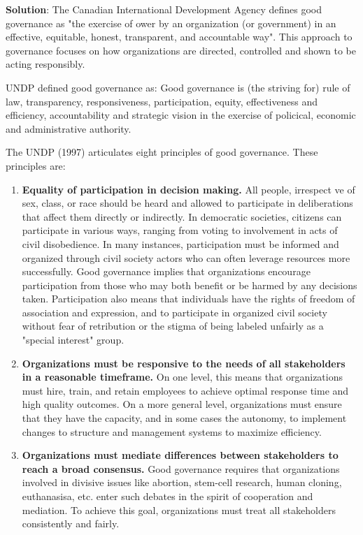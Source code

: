 \documentclass[
  openany]{book}
\newenvironment{solution}{ {\bfseries Solution}:}{}
\begin{document}
\begin{questions}
\begin{solution}
The Canadian International Development Agency defines good governance as "the exercise of ower by an organization (or government) in an effective, equitable, honest, transparent, and accountable way". This approach to governance focuses on how organizations are directed, controlled and shown to be acting responsibly.

UNDP defined good governance as: Good governance is (the striving for) rule of law, transparency, responsiveness, participation, equity, effectiveness and efficiency, accountability and strategic vision in the exercise of policical, economic and administrative authority.

The UNDP (1997) articulates eight principles of good governance. These principles are:

\begin{enumerate}
\item \textbf{Equality of participation in decision making.} All people, irrespect ve of sex, class, or race should be heard and allowed to participate in deliberations that affect them directly or indirectly. In democratic societies, citizens can participate in various ways, ranging from voting to involvement in acts of civil disobedience. In many instances, participation must be informed and organized through civil society actors who can often leverage resources more successfully. Good governance implies that organizations encourage participation from those who may both benefit or be harmed by any decisions taken. Participation also means that individuals have the rights of freedom of association and expression, and to participate in organized civil society without fear of retribution or the stigma of being labeled unfairly as a "special interest" group.
\item \textbf{Organizations must be responsive to the needs of all stakeholders in a reasonable timeframe.} On one level, this means that organizations must hire, train, and retain employees to achieve optimal response time and high quality outcomes. On a more general level, organizations must ensure that they have the capacity, and in some cases the autonomy, to implement changes to structure and management systems to maximize efficiency.
\item \textbf{Organizations must mediate differences between stakeholders to reach a broad consensus.} Good governance requires that organizations involved in divisive issues like abortion, stem-cell research, human cloning, euthanasisa, etc. enter such debates in the spirit of cooperation and mediation. To achieve this goal, organizations must treat all stakeholders consistently and fairly.

\end{enumerate}
\end{solution}
\end{questions}
\end{document}
